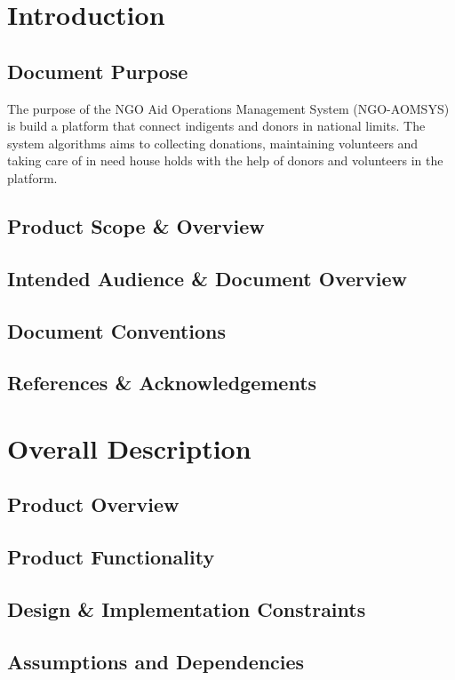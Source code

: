 \documentclass{report}
\begin{document}
	\chapter{Introduction}
		\section{Document Purpose}
  
                 The purpose of the NGO Aid Operations Management System (NGO-AOMSYS) is build a platform that connect indigents and donors in national limits.
                 The system algorithms aims to collecting donations, maintaining volunteers and taking care of in need house holds with the help of donors and 
                 volunteers in the platform.
		 
		\section{Product Scope \& Overview}
		\section{Intended Audience \& Document Overview}
		\section{Document Conventions}
		\section{References \& Acknowledgements}
	\chapter{Overall Description}
		\section{Product Overview}
		\section{Product Functionality}
		\section{Design \& Implementation Constraints}
		\section{Assumptions and Dependencies}
\end{document}
